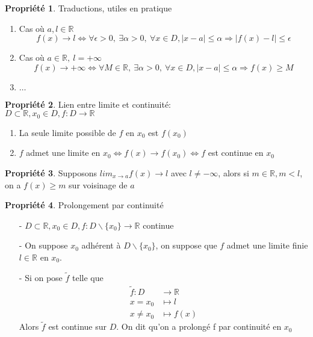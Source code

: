 \documentclass[fleqn]{article}
\theoremstyle{definition} \newtheorem*{defi}{D\'efinition}
\theoremstyle{definition} \newtheorem*{theo}{Th\'eor\`eme}
\theoremstyle{definition} \newtheorem*{prop}{Propri\'et\'e}
\theoremstyle{remark} \newtheorem*{rqs}{Remarques}
\begin{document}
\begin{prop} Traductions, utiles en pratique
	\begin{enumerate}
		\item Cas o\`u $a,l \in \mathbb{R}$
			\[f(x) \rightarrow l \Leftrightarrow \forall \epsilon > 0,\ \exists \alpha > 0,\ \forall x \in D, |x-a| \leq \alpha \Rightarrow
			|f(x) - l| \leq \epsilon\]
		\item Cas o\`u $a \in \mathbb{R},\ l = +\infty$
			\[f(x) \rightarrow +\infty \Leftrightarrow \forall M \in \mathbb{R},\ \exists \alpha > 0,\ \forall x \in D, |x-a| \leq
			\alpha \Rightarrow f(x) \geq M\]
		\item $\hdots$
	\end{enumerate}
\end{prop}

\begin{prop} Lien entre limite et continuit\'e: \\
	$D \subset \mathbb{R}, x_0 \in D, f:D \rightarrow \mathbb{R}$
	\begin{enumerate}
		\item La seule limite possible de $f$ en $x_0$ est $f(x_0)$
		\item $f$ admet une limite en $x_0 \Leftrightarrow f(x) \rightarrow f(x_0) \Leftrightarrow f$ est continue en $x_0$
	\end{enumerate}
\end{prop}

\begin{prop}
	Supposons $lim_{x \to a} f(x) \rightarrow l$ avec $l \neq -\infty$, alors si $m \in \mathbb{R}, m < l$, on a $f(x) \geq m$
	sur voisinage de $a$
\end{prop}

\begin{prop} Prolongement par continuit\'e
	\begin{itemize}
		\item [-] $D \subset \mathbb{R}, x_0 \in D, f:D \backslash \{x_0\} \rightarrow \mathbb{R}$ continue
		\item [-] On suppose $x_0$ adh\'erent \`a $D \backslash \{x_0\}$, on suppose que $f$ admet une limite finie $l \in \mathbb{R}$
			en $x_0$.
		\item [-] Si on pose $\tilde{f}$ telle que
			\begin{align*}
				\tilde{f}: D &\rightarrow \mathbb{R} \\
				x = x_0 &\mapsto l \\
				x \neq x_0 &\mapsto f(x)
			\end{align*}
		Alors $\tilde{f}$ est continue sur $D$. On dit qu'on a prolong\'e f par continuit\'e en $x_0$
	\end{itemize}
\end{prop}
\end{document}
